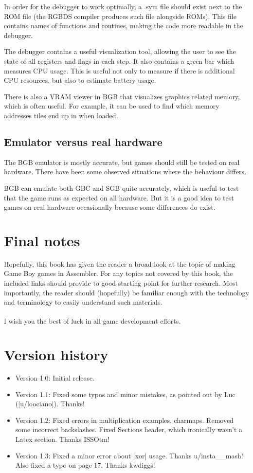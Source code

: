 \documentclass[11pt]{book}
\begin{document}
In order for the debugger to work optimally, a .sym file should exist next to the ROM file (the RGBDS compiler produces such file alongside ROMs). This file contains names of functions and routines, making the code more readable in the debugger.

The debugger contains a useful visualization tool, allowing the user to see the state of all registers and flags in each step. It also contains a green bar which measures CPU usage. This is useful not only to measure if there is additional CPU resources, but also to estimate battery usage.

There is also a VRAM viewer in BGB that visualizes graphics related memory, which is often useful. For example, it can be used to find which memory addresses tiles end up in when loaded.

\section{Emulator versus real hardware} 
The BGB emulator is mostly accurate, but games should still be tested on real hardware. There have been some observed situations where the behaviour differs. 

BGB can emulate both GBC and SGB quite accurately, which is useful to test that the game runs as expected on all hardware. But it is a good idea to test games on real hardware occasionally because some differences do exist.

\chapter{Final notes}
Hopefully, this book has given the reader a broad look at the topic of making Game Boy games in Assembler. For any topics not covered by this book, the included links should provide to good starting point for further research. Most importantly, the reader should (hopefully) be familiar enough with the technology and terminology to easily understand such materials.
~\\
~\\
\noindent I wish you the best of luck in all game development efforts. 

\chapter{Version history}
\begin{itemize}
\item Version 1.0: Initial release.
\item Version 1.1: Fixed some typos and minor mistakes, as pointed out by Luc (|u/loociano|). Thanks!
\item Version 1.2: Fixed errors in multiplication examples, charmaps. Removed some incorrect backslashes. Fixed Sections header, which ironically wasn't a Latex section. Thanks ISSOtm!
\item Version 1.3: Fixed a minor error about |xor| usage. Thanks u/insta\_\_mash! Also fixed a typo on page 17. Thanks kwdiggs!
\end{itemize}
\end{document}
